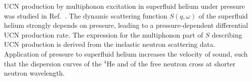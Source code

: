 
UCN production by multiphonon excitation in superfluid helium under
pressure was studied in Ref.~\cite{Schmidt2009}.  The dynamic
scattering function $S(q,\omega)$ of the superfluid helium strongly
depends on pressure, leading to a pressure-dependent differential UCN
production rate. The expression for the multiphonon part of $S$
describing UCN production is derived from the inelastic neutron
scattering data.  Application of pressure to superfluid helium
increases the velocity of sound, such that the dispersion curves of
the $^4$He and of the free neutron cross at shorter neutron
wavelength.


